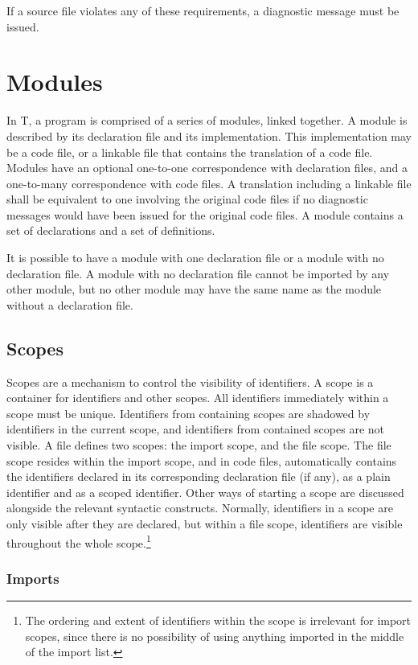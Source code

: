 \documentclass[letterpaper,12pt]{book}
\begin{document}
If a source file violates any of these requirements, a diagnostic message must be issued.

\chapter{Modules}

In T, a program is comprised of a series of modules, linked together. A module is described by its declaration file and its implementation. This implementation may be a code file, or a linkable file that contains the translation of a code file. Modules have an optional one-to-one correspondence with declaration files, and a one-to-many correspondence with code files. A translation including a linkable file shall be equivalent to one involving the original code files if no diagnostic messages would have been issued for the original code files. A module contains a set of declarations and a set of definitions.

It is possible to have a module with one declaration file or a module with no declaration file. A module with no declaration file cannot be imported by any other module, but no other module may have the same name as the module without a declaration file.

\section{Scopes}

Scopes are a mechanism to control the visibility of identifiers. A scope is a container for identifiers and other scopes. All identifiers immediately within a scope must be unique. Identifiers from containing scopes are shadowed by identifiers in the current scope, and identifiers from contained scopes are not visible. A file defines two scopes: the import scope, and the file scope. The file scope resides within the import scope, and in code files, automatically contains the identifiers declared in its corresponding declaration file (if any), as a plain identifier and as a scoped identifier. Other ways of starting a scope are discussed alongside the relevant syntactic constructs. Normally, identifiers in a scope are only visible after they are declared, but within a file scope, identifiers are visible throughout the whole scope.\footnote{The ordering and extent of identifiers within the scope is irrelevant for import scopes, since there is no possibility of using anything imported in the middle of the import list.}

\subsection{Imports}
\end{document}
